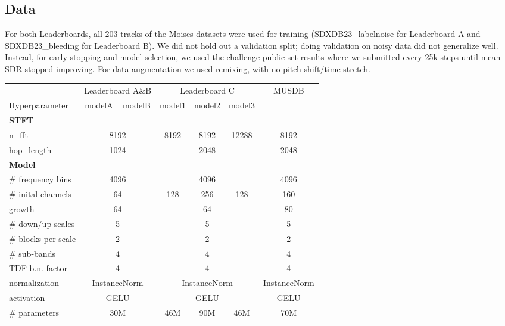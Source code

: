 \documentclass[10pt]{article}
\begin{document}
\subsection{Data}
\label{ssec:ab_data}
For both Leaderboards, all 203 tracks of the Moises datasets were used for training (SDXDB23\_labelnoise for Leaderboard A and SDXDB23\_bleeding for Leaderboard B). We did not hold out a validation split; doing validation on noisy data did not generalize well. Instead, for early stopping and model selection, we used the challenge public set results where we submitted every 25k steps until mean SDR stopped improving. For data augmentation we used remixing, with no pitch-shift/time-stretch.

\begingroup
\setlength{\tabcolsep}{8pt}
\renewcommand{\arraystretch}{1.0}
\begin{table*}[t]
\centering

\begin{tabular}{l|cc|ccc|c}
\hline\hline
\multicolumn{1}{l|}{} & \multicolumn{2}{c|}{Leaderboard A\&B} & \multicolumn{3}{c|}{Leaderboard C} & \multicolumn{1}{c}{MUSDB}\\ 
Hyperparameter & modelA & modelB & model1 & model2 & model3 & \\

\hline
\textbf{STFT} &  &  &  &  &  &  \\
\multicolumn{1}{l|}{n\_fft} & \multicolumn{2}{c|}{8192} & 8192 & 8192 & 12288 & 8192\\ 
\multicolumn{1}{l|}{hop\_length} & \multicolumn{2}{c|}{1024} & \multicolumn{3}{c|}{2048} & 2048\\

\hline
\textbf{Model} &  &  &  &  &  &  \\
\multicolumn{1}{l|}{\# frequency bins} & \multicolumn{2}{c|}{4096} & \multicolumn{3}{c|}{4096} & 4096\\ 
\multicolumn{1}{l|}{\# inital channels} & \multicolumn{2}{c|}{64} & 128 & 256 & 128 & 160\\ 
\multicolumn{1}{l|}{growth} & \multicolumn{2}{c|}{64} & \multicolumn{3}{c|}{64} & 80\\ 
\multicolumn{1}{l|}{\# down/up scales} & \multicolumn{2}{c|}{5} & \multicolumn{3}{c|}{5} & 5\\ 
\multicolumn{1}{l|}{\# blocks per scale} & \multicolumn{2}{c|}{2} & \multicolumn{3}{c|}{2} & 2\\ 
\multicolumn{1}{l|}{\# sub-bands} & \multicolumn{2}{c|}{4} & \multicolumn{3}{c|}{4} & 4\\
\multicolumn{1}{l|}{TDF b.n. factor\cite{tdf}} & \multicolumn{2}{c|}{4} & \multicolumn{3}{c|}{4} & 4\\
\multicolumn{1}{l|}{normalization} & \multicolumn{2}{c|}{InstanceNorm} & \multicolumn{3}{c|}{InstanceNorm} & InstanceNorm\\ 
\multicolumn{1}{l|}{activation} & \multicolumn{2}{c|}{GELU} & \multicolumn{3}{c|}{GELU} & GELU\\
\multicolumn{1}{l|}{\# parameters} & \multicolumn{2}{c|}{30M} & 46M & 90M & 46M & 70M\\


\end{tabular}
\end{table*}
\end{document}

